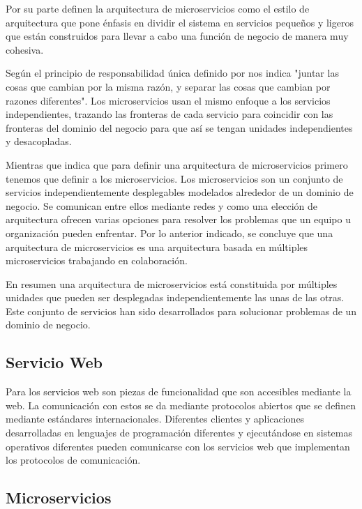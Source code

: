 Por su parte \cite{alshuqayran2016systematic} definen la arquitectura de microservicios como el estilo de arquitectura
que pone énfasis en dividir el sistema en servicios pequeños y ligeros que están construidos para
llevar a cabo una función de negocio de manera muy cohesiva.

Según el principio de responsabilidad única definido por \cite{martin2013clean} nos indica "juntar las
cosas que cambian por la misma razón, y separar las cosas que cambian por razones diferentes".
Los microservicios usan el mismo enfoque a los servicios independientes, trazando las fronteras
de cada servicio para coincidir con las fronteras del dominio del negocio para que así
se tengan unidades independientes y desacopladas.

Mientras que \cite{newman2019monolith} indica que para definir una arquitectura de microservicios primero tenemos que
definir a los microservicios. Los microservicios son un conjunto de servicios independientemente
desplegables modelados alrededor de un dominio de negocio. Se comunican entre ellos mediante redes
y como una elección de arquitectura ofrecen varias opciones para resolver los problemas que un
equipo u organización pueden enfrentar. Por lo anterior indicado, se concluye que una arquitectura
de microservicios es una arquitectura basada en múltiples microservicios trabajando en colaboración.

En resumen una arquitectura de microservicios está constituida por múltiples unidades que pueden ser
desplegadas independientemente las unas de las otras. Este conjunto de servicios han sido desarrollados
para solucionar problemas de un dominio de negocio.


\subsection{Servicio Web}

Para \cite{bruijn2006web} los servicios web son piezas de funcionalidad que son accesibles mediante la web.
La comunicación con estos se da mediante protocolos abiertos que se definen mediante estándares internacionales.
Diferentes clientes y aplicaciones desarrolladas en lenguajes de programación diferentes y ejecutándose
en sistemas operativos diferentes pueden comunicarse con los servicios web que implementan
los protocolos de comunicación.


\subsection{Microservicios}

